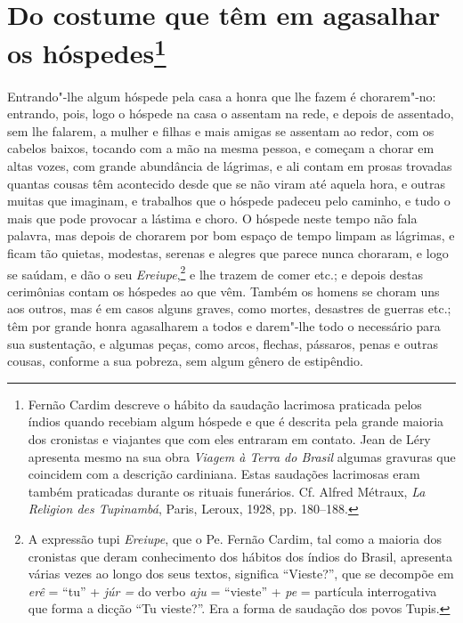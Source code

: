 \section[Do costume que têm em agasalhar os hóspedes]{Do costume que têm em\break 
agasalhar os hóspedes\protect\footnote[*]{ \MakeUppercase{F}ernão \MakeUppercase{C}ardim descreve o hábito da
saudação lacrimosa praticada pelos índios quando recebiam algum
hóspede e que é descrita pela grande maioria dos cronistas e viajantes
que com eles entraram em contato. \MakeUppercase{J}ean de \MakeUppercase{L}éry apresenta mesmo na
sua obra \textit{\MakeUppercase{V}iagem à \MakeUppercase{T}erra do \MakeUppercase{B}rasil} algumas gravuras que
coincidem com a descrição cardiniana. \MakeUppercase{E}stas saudações lacrimosas eram
também praticadas durante os rituais funerários. \MakeUppercase{C}f. \MakeUppercase{A}lfred \MakeUppercase{M}étraux,
\textit{\MakeUppercase{L}a \MakeUppercase{R}eligion des \MakeUppercase{T}upinambá}, \MakeUppercase{P}aris, \MakeUppercase{L}eroux, 1928, pp. 180--188.}} 
Entrando"-lhe algum hóspede pela casa a honra que lhe fazem é
chorarem"-no: entrando, pois, logo o hóspede na casa o assentam na rede,
e depois de assentado, sem lhe falarem, a mulher e filhas e mais
amigas se assentam ao redor, com os cabelos baixos, tocando com a mão
na mesma pessoa, e começam a chorar em altas vozes, com grande
abundância de lágrimas, e ali contam em prosas trovadas quantas cousas
têm acontecido desde que se não viram até aquela hora, e outras muitas
que imaginam, e trabalhos que o hóspede padeceu pelo caminho, e tudo o
mais que pode provocar a lástima e choro. O hóspede neste tempo não
fala palavra, mas depois de chorarem por bom espaço de tempo limpam as
lágrimas, e ficam tão quietas, modestas, serenas e alegres que parece
nunca choraram, e logo se saúdam, e dão o seu 
\textit{Ereiupe},\footnote{ A expressão tupi \textit{Ereiupe}, que o Pe. Fernão
Cardim, tal como a maioria dos cronistas que deram conhecimento dos
hábitos dos índios do Brasil, apresenta várias vezes ao longo dos seus
textos, significa ``Vieste?'', que se decompõe em \textit{erê} = ``tu'' +
\textit{júr =} do verbo \textit{aju} = ``vieste'' + \textit{pe} =
partícula interrogativa que forma a dicção ``Tu vieste?''. Era a forma
de saudação dos povos Tupis.} e lhe trazem de comer etc.; e
depois destas cerimônias contam os hóspedes ao que vêm. Também os
homens se choram uns aos outros, mas é em casos alguns graves, como
mortes, desastres de guerras etc.; têm por grande honra agasalharem a
todos e darem"-lhe todo o necessário para sua sustentação, e algumas
peças, como arcos, flechas, pássaros, penas e outras cousas, conforme a
sua pobreza, sem algum gênero de estipêndio.

